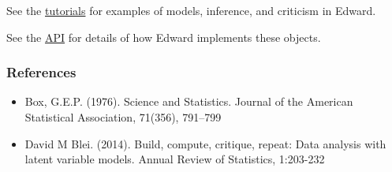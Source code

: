 See the \href{tutorials}{tutorials} for examples of models,
inference, and criticism in Edward.

See the \href{api/}{API} for details of how Edward implements these
objects.

\subsubsection{References}\label{references}

\begin{itemize}
\item
  Box, G.E.P. (1976). Science and Statistics. Journal of the American
  Statistical Association, 71(356), 791–799
\item
  David M Blei. (2014). Build, compute, critique, repeat: Data analysis with
  latent variable models. Annual Review of Statistics, 1:203-232
\end{itemize}
